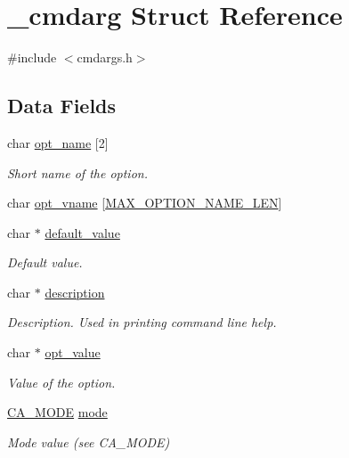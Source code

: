 \hypertarget{struct__cmdarg}{\section{\-\_\-cmdarg Struct Reference}
\label{struct__cmdarg}
}


{\ttfamily \#include $<$cmdargs.\-h$>$}

\subsection*{Data Fields}
\begin{DoxyCompactItemize}
\item 
char \hyperlink{struct__cmdarg_adccd5b372eb268994f66c0a5f37288f1}{opt\-\_\-name} \mbox{[}2\mbox{]}
\begin{DoxyCompactList}\small\item\em Short name of the option. \end{DoxyCompactList}\item 
char \hyperlink{struct__cmdarg_adb6a7f6cccad876d424ed56e78f7ed31}{opt\-\_\-vname} \mbox{[}\hyperlink{cmdargs_8h_a15a8a0a2b3e17efb5b9d9ab5f4c93bee}{M\-A\-X\-\_\-\-O\-P\-T\-I\-O\-N\-\_\-\-N\-A\-M\-E\-\_\-\-L\-E\-N}\mbox{]}
\item 
char $\ast$ \hyperlink{struct__cmdarg_a63daa7373909719597b83a97f0a9d2a9}{default\-\_\-value}
\begin{DoxyCompactList}\small\item\em Default value. \end{DoxyCompactList}\item 
char $\ast$ \hyperlink{struct__cmdarg_a8444d6e0dfe2bbab0b5e7b24308f1559}{description}
\begin{DoxyCompactList}\small\item\em Description. Used in printing command line help. \end{DoxyCompactList}\item 
char $\ast$ \hyperlink{struct__cmdarg_a646c3fdca1a55fadce39de99ace53684}{opt\-\_\-value}
\begin{DoxyCompactList}\small\item\em Value of the option. \end{DoxyCompactList}\item 
\hyperlink{cmdargs_8h_aa9bf4c218046aae7639d1f7341d5b130}{C\-A\-\_\-\-M\-O\-D\-E} \hyperlink{struct__cmdarg_af7422d78fdb9e20162e80094b054893d}{mode}
\begin{DoxyCompactList}\small\item\em Mode value (see C\-A\-\_\-\-M\-O\-D\-E) \end{DoxyCompactList}\item 

\end{DoxyCompactItemize}
